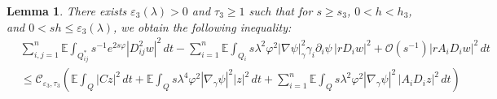 \documentclass[11pt,oneside,leqno]{amsart}
\numberwithin{equation}{section}
\numberwithin{equation}{section}
\newcommand{\E}{\mathbb{E}}
\newtheorem{lemma}[theorem]{Lemma}
\begin{document}
\begin{lemma}\label{lem:inequalityDDz} 
There exists $\varepsilon_3(\lambda)>0$ and $\tau_3\geq1$ such that for $s\geq s_3$, $0<h<h_3$, and $0<sh\leq \varepsilon_3(\lambda)$, we obtain the following inequality:
    \begin{equation*}
    \begin{split}
        &\sum_{i,j=1}^{n}\E\int_{Q_{ij}^{\ast}}s^{-1}e^{2s\varphi}|D_{ij}^2w|^2\, dt-\sum_{i=1}^{n}\E\int_{Q_i}s\lambda^2\varphi^2|\nabla\psi|_{\gamma}^2\gamma_i \partial_i\psi\,|rD_iw|^2+\mathcal{O}(s^{-1})|rA_iD_iw|^2\,dt\\
        &\leq \mathcal{C}_{\varepsilon_3,\tau_3}\left(\E\int_{Q}|Cz|^2\,dt+\E\int_{Q}s\lambda^4\varphi^2|\nabla_{\gamma}\psi|^2|z|^2\,dt+\sum_{i=1}^{n}\E\int_{Q}s\lambda^2\varphi^2|\nabla_{\gamma}\psi|^2\,|A_iD_iz|^2\,dt\right)
    \end{split}
    \end{equation*}
\end{lemma}
\end{document}
